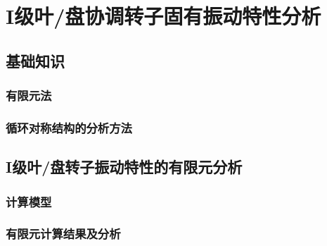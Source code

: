 \section{I级叶/盘协调转子固有振动特性分析}
\subsection{基础知识}
\subsubsection{有限元法}
\subsubsection{循环对称结构的分析方法}
\subsection{I级叶/盘转子振动特性的有限元分析}
\subsubsection{计算模型}
\subsubsection{有限元计算结果及分析}